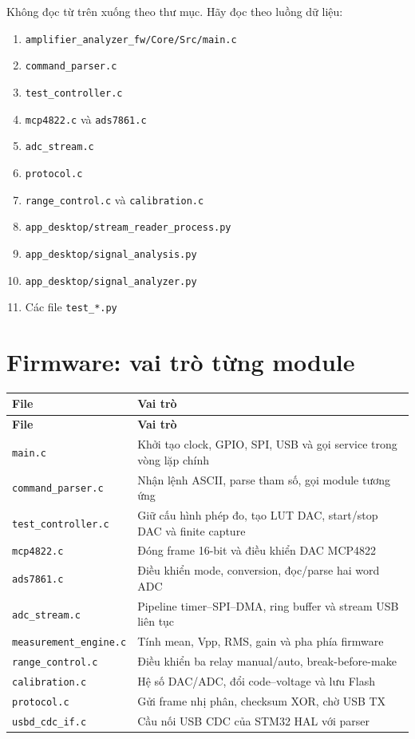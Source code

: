 \documentclass[12pt,a4paper,oneside]{article}
\newcommand{\inlinecode}[1]{\texttt{#1}}
\begin{document}
Không đọc từ trên xuống theo thư mục. Hãy đọc theo luồng dữ liệu:

\begin{enumerate}
\item \inlinecode{amplifier\_analyzer\_fw/Core/Src/main.c}
\item \inlinecode{command\_parser.c}
\item \inlinecode{test\_controller.c}
\item \inlinecode{mcp4822.c} và \inlinecode{ads7861.c}
\item \inlinecode{adc\_stream.c}
\item \inlinecode{protocol.c}
\item \inlinecode{range\_control.c} và \inlinecode{calibration.c}
\item \inlinecode{app\_desktop/stream\_reader\_process.py}
\item \inlinecode{app\_desktop/signal\_analysis.py}
\item \inlinecode{app\_desktop/signal\_analyzer.py}
\item Các file \inlinecode{test\_*.py}
\end{enumerate}

\section{Firmware: vai trò từng module}

\begin{longtable}{|>{\raggedright\arraybackslash}p{}|>{\raggedright\arraybackslash}p{}|}
\hline
\textbf{File} & \textbf{Vai trò} \\ \hline
\endfirsthead
\hline
\textbf{File} & \textbf{Vai trò} \\ \hline
\endhead
\inlinecode{main.c} & Khởi tạo clock, GPIO, SPI, USB và gọi service trong vòng lặp chính \\ \hline
\inlinecode{command\_parser.c} & Nhận lệnh ASCII, parse tham số, gọi module tương ứng \\ \hline
\inlinecode{test\_controller.c} & Giữ cấu hình phép đo, tạo LUT DAC, start/stop DAC và finite capture \\ \hline
\inlinecode{mcp4822.c} & Đóng frame 16-bit và điều khiển DAC MCP4822 \\ \hline
\inlinecode{ads7861.c} & Điều khiển mode, conversion, đọc/parse hai word ADC \\ \hline
\inlinecode{adc\_stream.c} & Pipeline timer–SPI–DMA, ring buffer và stream USB liên tục \\ \hline
\inlinecode{measurement\_engine.c} & Tính mean, Vpp, RMS, gain và pha phía firmware \\ \hline
\inlinecode{range\_control.c} & Điều khiển ba relay manual/auto, break-before-make \\ \hline
\inlinecode{calibration.c} & Hệ số DAC/ADC, đổi code–voltage và lưu Flash \\ \hline
\inlinecode{protocol.c} & Gửi frame nhị phân, checksum XOR, chờ USB TX \\ \hline
\inlinecode{usbd\_cdc\_if.c} & Cầu nối USB CDC của STM32 HAL với parser \\ \hline
\end{longtable}
\end{document}
